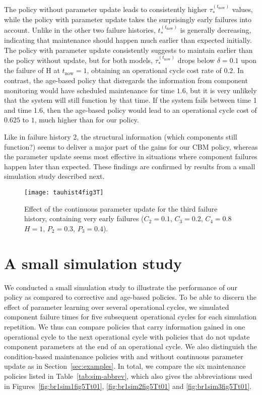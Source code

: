 \documentclass[authoryear]{elsarticle}
\def\tnow{t_\text{now}}
\newcommand{\tausnow}{\tau_*^{(\tnow)}}
\newcommand{\tstarnow}{t_*^{(\tnow)}}
\begin{document}
The policy without parameter update leads to consistently higher $\tausnow$ values,
while the policy with parameter update takes the surprisingly early failures into account.
Unlike in the other two failure histories, $\tstarnow$ is generally decreasing,
indicating that maintenance should happen much earlier than expected initially.
The policy with parameter update consistently suggests to maintain earlier than the policy without update,
but for both models, $\tausnow$ drops below $\delta = 0.1$ upon the failure of H at $\tnow = 1$,
obtaining an operational cycle cost rate of $0.2$.
In contrast, 
the age-based policy that disregards the information from component monitoring
would have scheduled maintenance for time $1.6$,
but it is very unlikely that the system will still function by that time.
If the system fails between time 1 and time 1.6,
then the age-based policy would lead to an operational cycle cost of $0.625$ to $1$,
much higher than for our policy.

Like in failure history 2, the structural information (which components still function?)
seems to deliver a major part of the gains for our CBM policy,
whereas the parameter update seems most effective in situations where
component failures happen later than expected.
These findings are confirmed by results from a small simulation study described next.

\begin{figure}
\texttt{[image: tauhist4fig3T]}
\caption{Effect of the continuous parameter update for the third failure history,
containing very early failures ($C_2 = 0.1$, $C_3 = 0.2$, $C_4 = 0.8$ $H = 1$, $P_2 = 0.3$, $P_3 = 0.4$).}
\label{fig:tauhist4fig3T}
\end{figure}


\section{A small simulation study}
\label{sec:sim}

We conducted a small simulation study to illustrate the performance of our policy
as compared to corrective and age-based policies.
To be able to discern the effect of parameter learning over several operational cycles,
we simulated component failure times for five subsequent operational cycles for each simulation repetition.
We thus can compare policies that carry information gained in one operational cycle to the next operational cycle
with policies that do not update component parameters at the end of an operational cycle.
We also distinguish the condition-based maintenance policies with and without continuous parameter update
as in Section~\ref{sec:examples}.
In total, we compare the six maintenance policies listed in Table~\ref{tab:sim-abbrev},
which also gives the abbreviations used in Figures~\ref{fig:br1sim1fig5Tt01}, \ref{fig:br1sim2fig5Tt01} and \ref{fig:br1sim3fig5Tt01}.
\end{document}
